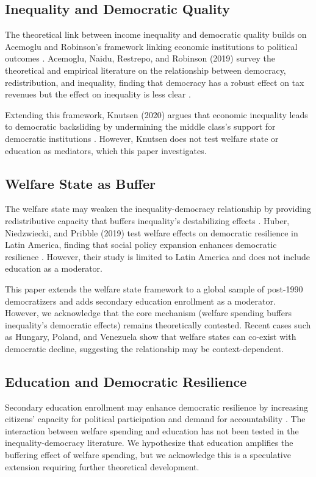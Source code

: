 \documentclass[11pt,letterpaper]{article}
\begin{document}
\subsection{Inequality and Democratic Quality}

The theoretical link between income inequality and democratic quality builds on Acemoglu and Robinson's framework linking economic institutions to political outcomes \cite{Acemoglu2019}. Acemoglu, Naidu, Restrepo, and Robinson (2019) survey the theoretical and empirical literature on the relationship between democracy, redistribution, and inequality, finding that democracy has a robust effect on tax revenues but the effect on inequality is less clear \cite{Acemoglu2019}.

Extending this framework, Knutsen (2020) argues that economic inequality leads to democratic backsliding by undermining the middle class's support for democratic institutions \cite{Knutsen2020}. However, Knutsen does not test welfare state or education as mediators, which this paper investigates.

\subsection{Welfare State as Buffer}

The welfare state may weaken the inequality-democracy relationship by providing redistributive capacity that buffers inequality's destabilizing effects \cite{Huber2019}. Huber, Niedzwiecki, and Pribble (2019) test welfare effects on democratic resilience in Latin America, finding that social policy expansion enhances democratic resilience \cite{Huber2019}. However, their study is limited to Latin America and does not include education as a moderator.

This paper extends the welfare state framework to a global sample of post-1990 democratizers and adds secondary education enrollment as a moderator. However, we acknowledge that the core mechanism (welfare spending buffers inequality's democratic effects) remains theoretically contested. Recent cases such as Hungary, Poland, and Venezuela show that welfare states can co-exist with democratic decline, suggesting the relationship may be context-dependent.

\subsection{Education and Democratic Resilience}

Secondary education enrollment may enhance democratic resilience by increasing citizens' capacity for political participation and demand for accountability \cite{Huber2019}. The interaction between welfare spending and education has not been tested in the inequality-democracy literature. We hypothesize that education amplifies the buffering effect of welfare spending, but we acknowledge this is a speculative extension requiring further theoretical development.
\end{document}
